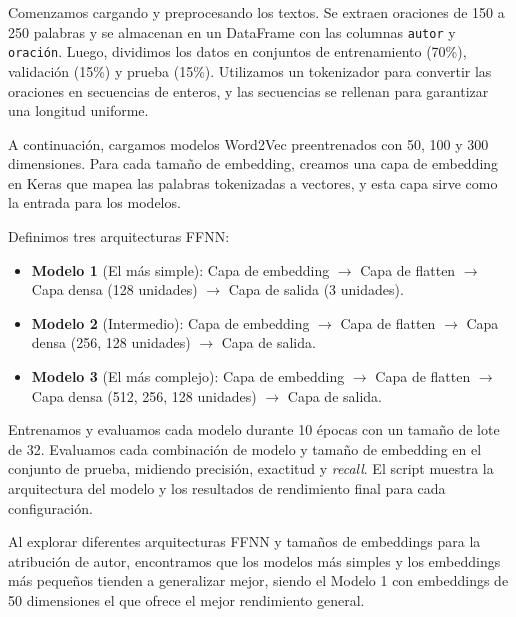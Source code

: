 \documentclass[11pt,english]{article}
\theoremstyle{plain}
\begin{document}
Comenzamos cargando y preprocesando los textos. Se extraen oraciones de 150 a 250 palabras y se almacenan en un DataFrame con las columnas \texttt{autor} y \texttt{oración}. Luego, dividimos los datos en conjuntos de entrenamiento (70\%), validación (15\%) y prueba (15\%). Utilizamos un tokenizador para convertir las oraciones en secuencias de enteros, y las secuencias se rellenan para garantizar una longitud uniforme.

A continuación, cargamos modelos Word2Vec preentrenados con 50, 100 y 300 dimensiones. Para cada tamaño de embedding, creamos una capa de embedding en Keras que mapea las palabras tokenizadas a vectores, y esta capa sirve como la entrada para los modelos.

Definimos tres arquitecturas FFNN:
\begin{itemize}
    \item \textbf{Modelo 1} (El más simple): Capa de embedding $\rightarrow$ Capa de flatten $\rightarrow$ Capa densa (128 unidades) $\rightarrow$ Capa de salida (3 unidades).
    \item \textbf{Modelo 2} (Intermedio): Capa de embedding $\rightarrow$ Capa de flatten $\rightarrow$ Capa densa (256, 128 unidades) $\rightarrow$ Capa de salida.
    \item \textbf{Modelo 3} (El más complejo): Capa de embedding $\rightarrow$ Capa de flatten $\rightarrow$ Capa densa (512, 256, 128 unidades) $\rightarrow$ Capa de salida.
\end{itemize}

Entrenamos y evaluamos cada modelo durante 10 épocas con un tamaño de lote de 32. Evaluamos cada combinación de modelo y tamaño de embedding en el conjunto de prueba, midiendo precisión, exactitud y \textit{recall}. El script muestra la arquitectura del modelo y los resultados de rendimiento final para cada configuración.

Al explorar diferentes arquitecturas FFNN y tamaños de embeddings para la atribución de autor, encontramos que los modelos más simples y los embeddings más pequeños tienden a generalizar mejor, siendo el Modelo 1 con embeddings de 50 dimensiones el que ofrece el mejor rendimiento general.
\end{document}
